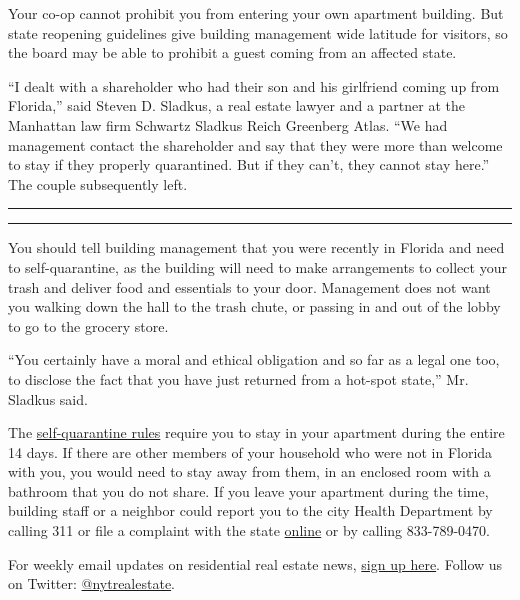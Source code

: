 Your co-op cannot prohibit you from entering your own apartment
building. But state reopening guidelines give building management wide
latitude for visitors, so the board may be able to prohibit a guest
coming from an affected state.

``I dealt with a shareholder who had their son and his girlfriend coming
up from Florida,'' said Steven D. Sladkus, a real estate lawyer and a
partner at the Manhattan law firm Schwartz Sladkus Reich Greenberg
Atlas. ``We had management contact the shareholder and say that they
were more than welcome to stay if they properly quarantined. But if they
can't, they cannot stay here.'' The couple subsequently left.

\begin{center}\rule{0.5\linewidth}{\linethickness}\end{center}

\begin{center}\rule{0.5\linewidth}{\linethickness}\end{center}

You should tell building management that you were recently in Florida
and need to self-quarantine, as the building will need to make
arrangements to collect your trash and deliver food and essentials to
your door. Management does not want you walking down the hall to the
trash chute, or passing in and out of the lobby to go to the grocery
store.

``You certainly have a moral and ethical obligation and so far as a
legal one too, to disclose the fact that you have just returned from a
hot-spot state,'' Mr. Sladkus said.

The
\href{https://coronavirus.health.ny.gov/system/files/documents/2020/07/nys-covid-travel-advisory-faq.pdf}{self-quarantine
rules} require you to stay in your apartment during the entire 14 days.
If there are other members of your household who were not in Florida
with you, you would need to stay away from them, in an enclosed room
with a bathroom that you do not share. If you leave your apartment
during the time, building staff or a neighbor could report you to the
city Health Department by calling 311 or file a complaint with the state
\href{https://mylicense.custhelp.com/app/ask}{online} or by calling
833-789-0470.

For weekly email updates on residential real estate news,
\href{http://www.nytimes.com/newsletters/realestate/}{sign up here}.
Follow us on Twitter:
\href{https://twitter.com/nytrealestate}{@nytrealestate}.

